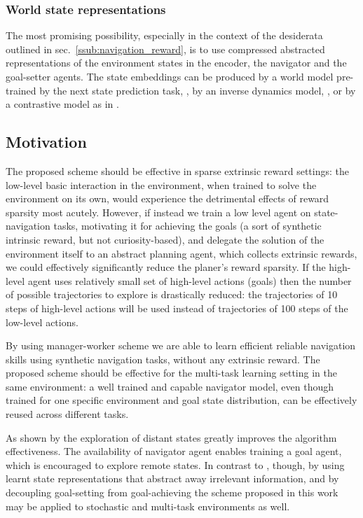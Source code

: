 \documentclass[acmsmall, nonacm]{acmart}
\begin{document}
\subsubsection{World state representations}

The most promising possibility, especially in the context of the desiderata outlined in sec.~\ref{ssub:navigation_reward}, is to use compressed abstracted representations of the environment states in the encoder, the navigator and the goal-setter agents. The state embeddings can be produced by a world model pre-trained by the next state prediction task, \citep{ha_recurrent_2018}, by an inverse dynamics model, \citep{badia_never_2020}, or by a contrastive model as in \citep{Ugadiarov2021LongTermEI}.

\subsection{Motivation}

The proposed scheme should be effective in sparse extrinsic reward settings: the low-level basic interaction in the environment, when trained to solve the environment on its own, would experience the detrimental effects of reward sparsity most acutely. However, if instead we train a low level agent on state-navigation tasks, motivating it for achieving the goals (a sort of synthetic intrinsic reward, but not curiosity-based), and delegate the solution of the environment itself to an abstract planning agent, which collects extrinsic rewards, we could effectively significantly reduce the planer's reward sparsity. If the high-level agent uses relatively small set of high-level actions (goals) then the number of possible trajectories to explore is drastically reduced: the trajectories of 10 steps of high-level actions will be used instead of trajectories of 100 steps of the low-level actions.

By using manager-worker scheme we are able to learn efficient reliable navigation skills using synthetic navigation tasks, 
without any extrinsic reward.
%
The proposed scheme should be effective for the multi-task learning setting in the same environment: a well trained and capable navigator model, even though trained for one specific environment and goal state distribution, can be effectively reused across different tasks.

As shown by \citet{ecoffet_first_2021} the exploration of distant states greatly improves the algorithm effectiveness. The availability of navigator agent enables training a goal agent, which is encouraged to explore remote states.
%
In contrast to \citep{ecoffet_first_2021}, though, by using learnt state representations that abstract away irrelevant information, and by decoupling goal-setting from goal-achieving the scheme proposed in this work may be applied to stochastic and multi-task environments as well.
\end{document}
